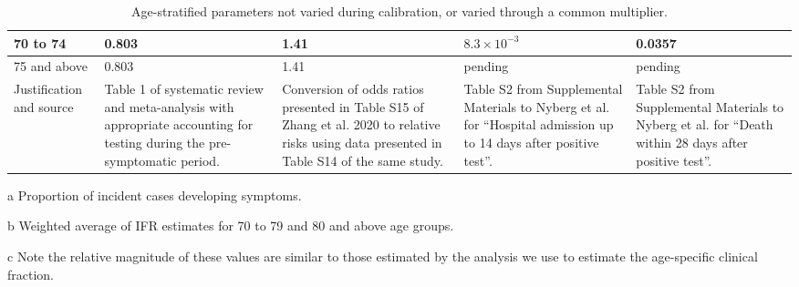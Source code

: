 \begin{table}
\begin{threeparttable}
\begin{tabularx}{\textwidth}{| X | X | X | X | X |}
        \hline
        70 to 74 & 0.803 & 1.41 & $8.3\times10^{-3}$ & 0.0357 \\
        \hline
        75 and above & 0.803 & 1.41 & pending \tnote{b} & pending \\
        \hline
        Justification and source & 
        Table 1 of systematic review and meta-analysis with appropriate accounting for testing during the pre-symptomatic period\cite{sah-2021}. & 
        Conversion of odds ratios presented in Table S15 of Zhang et al. 2020 to relative risks using data presented in Table S14 of the same study\cite{zhang-2020-a}\tnote{c}. &
        Table S2 from Supplemental Materials to Nyberg et al. for ``Hospital admission up to 14 days after positive test''. &  %
        Table S2 from Supplemental Materials to Nyberg et al. for ``Death within 28 days after positive test''. \\  %
        \hline
	\end{tabularx}
	\caption{Age-stratified parameters not varied during calibration, or varied through a common multiplier.}
	\label{tab:age_params}
    \begin{tablenotes}
        \item[a] Proportion of incident cases developing symptoms.
        \item[b] Weighted average of IFR estimates for 70 to 79 and 80 and above age groups.
        \item[c] Note the relative magnitude of these values are similar to those estimated by the analysis we use to estimate the age-specific clinical fraction.
    \end{tablenotes}
    \end{threeparttable}
\end{table}
